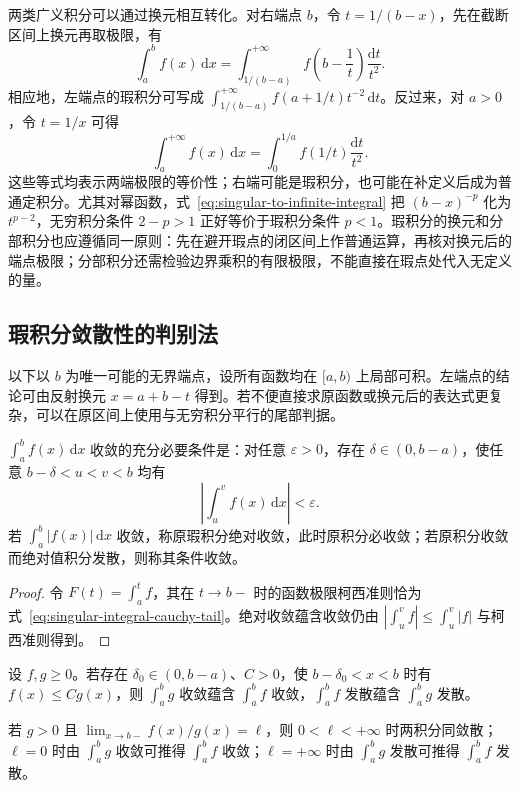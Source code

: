 \documentclass[UTF8,12pt,a4paper,fontset=fandol]{ctexbook}
\begin{document}
两类广义积分可以通过换元相互转化。对右端点 $b$，令 $t=1/(b-x)$，先在截断区间上换元再取极限，有
\begin{equation}
    \int_a^b f(x)\,\mathrm{d}x
    =\int_{1/(b-a)}^{+\infty}
        f\left(b-\frac1t\right)\frac{\mathrm{d}t}{t^2}.
    \label{eq:singular-to-infinite-integral}
\end{equation}
相应地，左端点的瑕积分可写成 $\int_{1/(b-a)}^{+\infty}f(a+1/t)t^{-2}\,\mathrm{d}t$。反过来，对 $a>0$，令 $t=1/x$ 可得
\[
    \int_a^{+\infty}f(x)\,\mathrm{d}x
    =\int_0^{1/a}f(1/t)\frac{\mathrm{d}t}{t^2}.
\]
这些等式均表示两端极限的等价性；右端可能是瑕积分，也可能在补定义后成为普通定积分。尤其对幂函数，式~\eqref{eq:singular-to-infinite-integral} 把 $(b-x)^{-p}$ 化为 $t^{p-2}$，无穷积分条件 $2-p>1$ 正好等价于瑕积分条件 $p<1$。瑕积分的换元和分部积分也应遵循同一原则：先在避开瑕点的闭区间上作普通运算，再核对换元后的端点极限；分部积分还需检验边界乘积的有限极限，不能直接在瑕点处代入无定义的量。

\subsection{瑕积分敛散性的判别法}
\label{subsec:convergence-tests-for-singular-integrals}

以下以 $b$ 为唯一可能的无界端点，设所有函数均在 $[a,b)$ 上局部可积。左端点的结论可由反射换元 $x=a+b-t$ 得到。若不便直接求原函数或换元后的表达式更复杂，可以在原区间上使用与无穷积分平行的尾部判据。

\begin{theorem}[瑕积分的柯西准则与绝对收敛]
\label{thm:cauchy-and-absolute-singular-integrals}
$\int_a^b f(x)\,\mathrm{d}x$ 收敛的充分必要条件是：对任意 $\varepsilon>0$，存在 $\delta\in(0,b-a)$，使任意 $b-\delta<u<v<b$ 均有
\begin{equation}
    \left|\int_u^v f(x)\,\mathrm{d}x\right|<\varepsilon.
    \label{eq:singular-integral-cauchy-tail}
\end{equation}
若 $\int_a^b|f(x)|\,\mathrm{d}x$ 收敛，称原瑕积分绝对收敛，此时原积分必收敛；若原积分收敛而绝对值积分发散，则称其条件收敛。
\end{theorem}

\begin{proof}
令 $F(t)=\int_a^t f$，其在 $t\to b-$ 时的函数极限柯西准则恰为式~\eqref{eq:singular-integral-cauchy-tail}。绝对收敛蕴含收敛仍由 $|\int_u^v f|\leq\int_u^v|f|$ 与柯西准则得到。
\end{proof}

\begin{theorem}[瑕积分的比较判别法]
\label{thm:comparison-tests-singular-integrals}
设 $f,g\geq0$。若存在 $\delta_0\in(0,b-a)$、$C>0$，使 $b-\delta_0<x<b$ 时有 $f(x)\leq Cg(x)$，则 $\int_a^b g$ 收敛蕴含 $\int_a^b f$ 收敛，$\int_a^b f$ 发散蕴含 $\int_a^b g$ 发散。

若 $g>0$ 且 $\lim_{x\to b-}f(x)/g(x)=\ell$，则 $0<\ell<+\infty$ 时两积分同敛散；$\ell=0$ 时由 $\int_a^b g$ 收敛可推得 $\int_a^b f$ 收敛；$\ell=+\infty$ 时由 $\int_a^b g$ 发散可推得 $\int_a^b f$ 发散。
\end{theorem}
\end{document}
